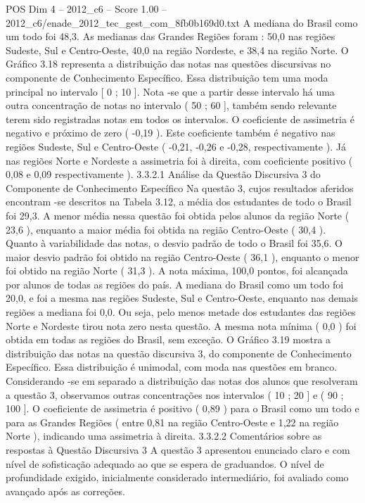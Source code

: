 \begin{textsample}{POS Dim 4 – 2012\_c6 – Score 1.00 – 2012\_c6/enade\_2012\_tec\_gest\_com\_8fb0b169d0.txt}
A mediana do Brasil como um todo foi 48,3.
As medianas das Grandes Regiões foram : 50,0 nas regiões Sudeste, Sul e Centro-Oeste, 40,0 na região Nordeste, e 38,4 na região Norte.
O Gráfico 3.18 representa a distribuição das notas nas questões discursivas no componente de Conhecimento Específico.
Essa distribuição tem uma moda principal no intervalo [ 0 ; 10 ].
Nota -se que a partir desse intervalo há uma outra concentração de notas no intervalo ( 50 ; 60 ], também sendo relevante terem sido registradas notas em todos os intervalos.
O coeficiente de assimetria é negativo e próximo de zero ( -0,19 ).
Este coeficiente também é negativo nas regiões Sudeste, Sul e Centro-Oeste ( -0,21, -0,26 e -0,28, respectivamente ).
Já nas regiões Norte e Nordeste a assimetria foi à direita, com coeficiente positivo ( 0,08 e 0,09 respectivamente ). 3.3.2.1 Análise da Questão Discursiva 3 do Componente de Conhecimento Específico Na questão 3, cujos resultados aferidos encontram -se descritos na Tabela 3.12, a média dos estudantes de todo o Brasil foi 29,3.
A menor média nessa questão foi obtida pelos alunos da região Norte ( 23,6 ), enquanto a maior média foi obtida na região Centro-Oeste ( 30,4 ).
Quanto à variabilidade das notas, o desvio padrão de todo o Brasil foi 35,6.
O maior desvio padrão foi obtido na região Centro-Oeste ( 36,1 ), enquanto o menor foi obtido na região Norte ( 31,3 ).
A nota máxima, 100,0 pontos, foi alcançada por alunos de todas as regiões do país.
A mediana do Brasil como um todo foi 20,0, e foi a mesma nas regiões Sudeste, Sul e Centro-Oeste, enquanto nas demais regiões a mediana foi 0,0.
Ou seja, pelo menos metade dos estudantes das regiões Norte e Nordeste tirou nota zero nesta questão.
A mesma nota mínima ( 0,0 ) foi obtida em todas as regiões do Brasil, sem exceção.
O Gráfico 3.19 mostra a distribuição das notas na questão discursiva 3, do componente de Conhecimento Específico.
Essa distribuição é unimodal, com moda nas questões em branco.
Considerando -se em separado a distribuição das notas dos alunos que resolveram a questão 3, observamos outras concentrações nos intervalos ( 10 ; 20 ] e ( 90 ; 100 ].
O coeficiente de assimetria é positivo ( 0,89 ) para o Brasil como um todo e para as Grandes Regiões ( entre 0,81 na região Centro-Oeste e 1,22 na região Norte ), indicando uma assimetria à direita. 3.3.2.2 Comentários sobre as respostas à Questão Discursiva 3 A questão 3 apresentou enunciado claro e com nível de sofisticação adequado ao que se espera de graduandos.
O nível de profundidade exigido, inicialmente considerado intermediário, foi avaliado como avançado após as correções.

\end{textsample}
